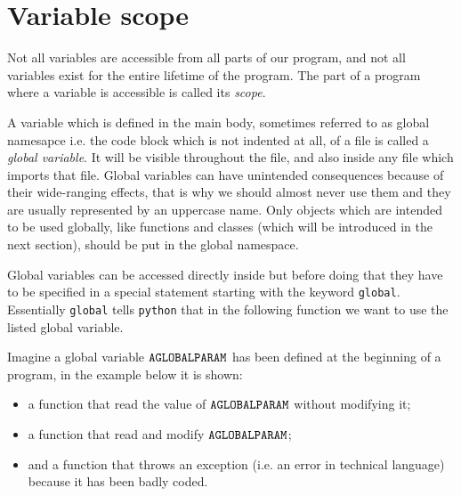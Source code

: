 \section{Variable scope}\label{advanced---variable-scope}

Not all variables are accessible from all parts of our program, and not all variables exist for the entire lifetime of the program. The part of a program where a variable is accessible is called its \emph{scope}.

A variable which is defined in the main body, sometimes referred to as global namesapce i.e. the code block which is not indented at all, of a file is called a \emph{global variable}. It will be visible throughout the file, and also inside any file which imports that file. Global variables can have unintended consequences because of their wide-ranging effects, that is why we should almost never use them and they are usually represented by an uppercase name. Only objects which are intended to be used globally, like functions and classes (which will be introduced in the next section), should be put in the global namespace.

Global variables can be accessed directly inside but before doing that they have to be specified in a special statement starting with the keyword \texttt{global}. Essentially \texttt{global} tells \texttt{python} that in the following function we want to use the listed global variable.

Imagine a global variable $\tt{AGLOBALPARAM}$ has been defined at the beginning of a program, in the example below it is shown:
\begin {itemize}
\item a function that read the value of $\tt{AGLOBALPARAM}$ without modifying it;
\item a function that read and modify $\tt{AGLOBALPARAM}$;
\item and a function that throws an exception (i.e. an error in technical language) because it has been badly coded.
\end{itemize}

